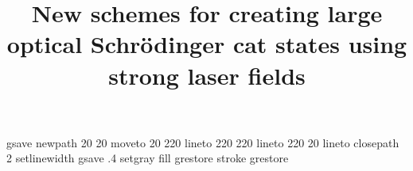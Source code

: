 %
%
%
%
%
\begin{filecontents*}{}
gsave
newpath
  20 20 moveto
  20 220 lineto
  220 220 lineto
  220 20 lineto
closepath
2 setlinewidth
gsave
  .4 setgray fill
grestore
stroke
grestore
\end{filecontents*}
%
\RequirePackage{fix-cm}
%
\documentclass[]{svjour3}          %
%
\smartqed  %
%
\usepackage{graphicx}
\usepackage{physics}
\usepackage{cite}
\usepackage{xcolor}
\usepackage{enumerate}
\usepackage{bbm}
\usepackage{MnSymbol}
\usepackage{appendix}
\usepackage{setspace}
\allowdisplaybreaks

\usepackage[
  bookmarks=true,
  colorlinks,
  linkcolor=black,
  urlcolor=black,
  citecolor=black,
  plainpages=false,
  pdfpagelabels,
  final,
  breaklinks=true
]{hyperref}
%
%
%
%
%
\sloppy
\title{New schemes for creating large optical Schrödinger cat states using
strong laser fields
}

